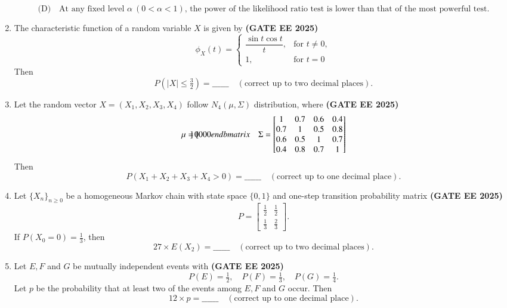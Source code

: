\documentclass[journal,12pt,onecolumn]{IEEEtran}
\theoremstyle{remark}
\begin{document}
\begin{enumerate}
\[
\text{(D)} \quad \text{At any fixed level $\alpha \ (0 < \alpha < 1)$, the power of the likelihood ratio test is lower than that of the most powerful test.}
\]

  
 \item The characteristic function of a random variable $X$ is given by \hfill \textbf{(GATE EE 2025)}
    \[
        \phi_X(t) = 
        \begin{cases}
            \dfrac{\sin t \cos t}{t}, & \text{for } t \neq 0, \\
            1, & \text{for } t = 0
        \end{cases}
    \]
    Then \[
        P\left( |X| \leq \tfrac{3}{2} \right) = \_\_\_\_\_\_ 
        \quad (\text{correct up to two decimal places}).
    \]
\item Let the random vector $X = (X_1, X_2, X_3, X_4)$ follow $N_4(\mu, \Sigma)$ distribution, where
\hfill \textbf{(GATE EE 2025)}
    \[
        \mu = 
        \begin{bmatrix}
            
        \end{bmatrix}
            0 \\ 0 \\ 0 \\ 0
        end{bmatrix}
        \quad 
        \Sigma = 
        \begin{bmatrix}
            1   & 0.7 & 0.6 & 0.4 \\
            0.7 & 1   & 0.5 & 0.8 \\
            0.6 & 0.5 & 1   & 0.7 \\
            0.4 & 0.8 & 0.7 & 1
        \end{bmatrix}
    \]
    Then
    \[
        P(X_1 + X_2 + X_3 + X_4 > 0) = \_\_\_\_\_\_
        \quad (\text{correct up to one decimal place}).
    \]

    \item Let $\{X_n\}_{n \geq 0}$ be a homogeneous Markov chain with state space $\{0,1\}$ and one-step transition probability matrix \hfill \textbf{(GATE EE 2025)}
    \[
        P = \begin{bmatrix}
            \tfrac{1}{2} & \tfrac{1}{2} \\
            \tfrac{1}{3} & \tfrac{2}{3}
        \end{bmatrix}.
    \]
    If $P(X_0 = 0) = \tfrac{1}{3}$, then
    \[
        27 \times E(X_2) = \_\_\_\_\_\_
        \quad (\text{correct up to two decimal places}).
    \]

    \item Let $E, F$ and $G$ be mutually independent events with \hfill \textbf{(GATE EE 2025)}
    \[
        P(E) = \tfrac{1}{2}, \quad P(F) = \tfrac{1}{3}, \quad P(G) = \tfrac{1}{4}.
    \]
    Let $p$ be the probability that at least two of the events among $E, F$ and $G$ occur. Then
    \[
        12 \times p = \_\_\_\_\_\_
        \quad (\text{correct up to one decimal place}).
    \]


\end{enumerate}
\end{document}
